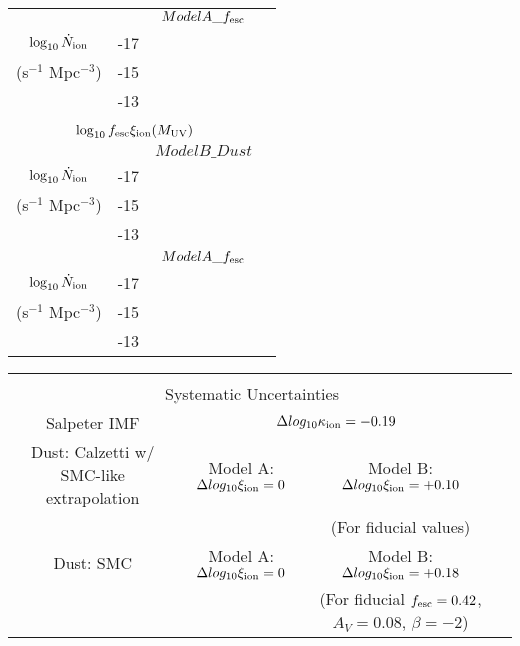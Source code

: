 \begin{table}
\begin{tabular}{cc|cccccc}
	  & & \multicolumn{5}{c}{$ModelA\_f_{\rm{esc}}$}\\
	  
$\log_{10} \dot{N}_{\rm{ion}}$	 		& -17 &  \\
(s$^{-1}$ Mpc$^{-3}$) 				& -15 &  \\
												& -13 &  \\											

	 \multicolumn{7}{c}{}\\
	 \multicolumn{7}{c}{$\log_{10}f_{\rm{esc}}\xi_{\rm{ion}}(M_{\rm{UV}})$}\\\hline
	 
	  & & \multicolumn{5}{c}{$ModelB\_Dust$}\\
	  
$\log_{10} \dot{N}_{\rm{ion}}$	 		& -17 &  \\
(s$^{-1}$ Mpc$^{-3}$) 				& -15 &  \\
												& -13 &  \\
												
	  & & \multicolumn{5}{c}{$ModelA\_f_{\rm{esc}}$}\\
	  
$\log_{10} \dot{N}_{\rm{ion}}$	 		& -17 &  \\
(s$^{-1}$ Mpc$^{-3}$) 				& -15 &  \\
												& -13 &  \\		

\end{tabular}
 
 \begin{tabular}{cc|cccccc}
	 \multicolumn{7}{c}{}\\
	 \multicolumn{7}{c}{Systematic Uncertainties}\\\hline
	 \multicolumn{2}{c}{Salpeter IMF} & \multicolumn{5}{c}{$\Delta log_{10}\kappa_{\rm{ion}} = -0.19$}\\

	 \multicolumn{2}{c}{Dust: Calzetti w/ SMC-like extrapolation} &  \multicolumn{2}{c}{Model A: $\Delta log_{10}\xi_{\rm{ion}} = 0$} & \multicolumn{3}{c}{Model B: $\Delta log_{10}\xi_{\rm{ion}} = +0.10$}\\
	 \multicolumn{2}{c}{} &  \multicolumn{2}{c}{} & \multicolumn{3}{c}{ (For fiducial values)}\\
 
	 	 \multicolumn{2}{c}{Dust: SMC \citep{Pei:1992ey}} &  \multicolumn{2}{c}{Model A: $\Delta log_{10}\xi_{\rm{ion}} = 0$} & \multicolumn{3}{c}{Model B: $\Delta log_{10}\xi_{\rm{ion}} = +0.18$} \\
	 	 \multicolumn{2}{c}{} &  \multicolumn{2}{c}{} & \multicolumn{3}{c}{(For fiducial $f_{\rm{esc}} = 0.42$, $A_{V} = 0.08$, $\beta = -2$)} \\
\end{tabular} \label{tab:finkelstein_N}
\end{table}
